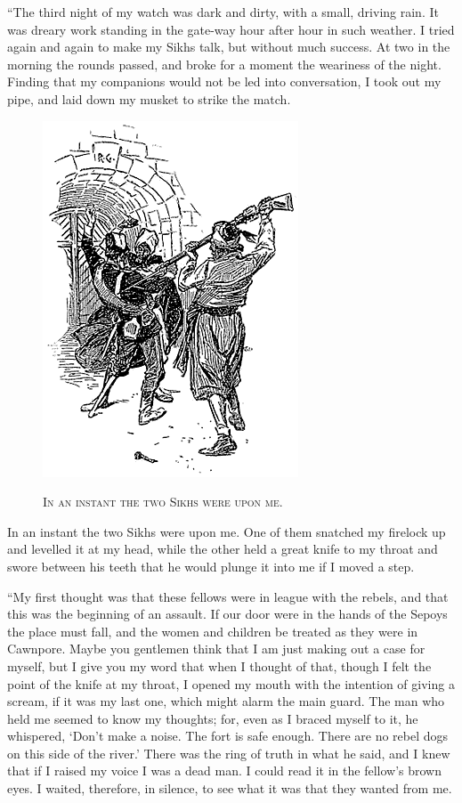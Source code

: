 \documentclass[12pt,english,oneside]{book}
\newcommand{\noun}[1]{\textsc{#1}}
\begin{document}
{}``The third night of my watch was dark and dirty, with a small,
driving rain. It was dreary work standing in the gate-way hour after
hour in such weather. I tried again and again to make my Sikhs talk,
but without much success. At two in the morning the rounds passed,
and broke for a moment the weariness of the night. Finding that my
companions would not be led into conversation, I took out my pipe,
and laid down my musket to strike the match. %
\begin{figure}[htbp]
\noindent \begin{center}\includegraphics{images/sign410-sign-21.png}\end{center}

\noindent \begin{center}\noun{In an instant the two Sikhs were upon
me.}\end{center}
\end{figure}
In an instant the two Sikhs were upon me. One of them snatched my
firelock up and levelled it at my head, while the other held a great
knife to my throat and swore between his teeth that he would plunge
it into me if I moved a step.

{}``My first thought was that these fellows were in league with the
rebels, and that this was the beginning of an assault. If our door
were in the hands of the Sepoys the place must fall, and the women
and children be treated as they were in Cawnpore. Maybe you gentlemen
think that I am just making out a case for myself, but I give you
my word that when I thought of that, though I felt the point of the
knife at my throat, I opened my mouth with the intention of giving
a scream, if it was my last one, which might alarm the main guard.
The man who held me seemed to know my thoughts; for, even as I braced
myself to it, he whispered, `Don't make a noise. The fort is safe
enough. There are no rebel dogs on this side of the river.' There
was the ring of truth in what he said, and I knew that if I raised
my voice I was a dead man. I could read it in the fellow's brown eyes.
I waited, therefore, in silence, to see what it was that they wanted
from me.
\end{document}
